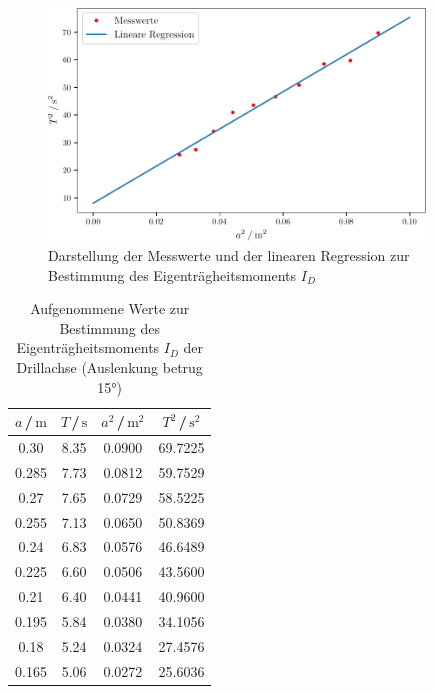 \begin{figure}
    \centering
    \includegraphics[width=10cm]{build/plot.pdf}
    \caption{Darstellung der Messwerte und der linearen Regression zur Bestimmung des Eigenträgheitsmoments $I_D$}
\end{figure}

\begin{table}[H]
\normalsize

\centering
{}
\begin{tabular}{c c c c}
\toprule
    $a$\,/\,$\si{\meter}$ &  $T$\,/\,$\si{\second}$ & $a^2$\,/\,$\si{\meter}^2$ &  $T^2$\,/\,$\si{\second}^2$ \\
    \midrule

0.30  &   8.35 &  0.0900      & 69.7225\\
0.285 &   7.73 &  0.0812  & 59.7529\\
0.27  &   7.65 &  0.0729    & 58.5225\\
0.255 &   7.13 &  0.0650  & 50.8369\\
0.24  &   6.83 &  0.0576    & 46.6489\\
0.225 &   6.60 &  0.0506  & 43.5600\\
0.21  &   6.40 &  0.0441    & 40.9600\\
0.195 &   5.84 &  0.0380  & 34.1056\\
0.18  &   5.24 &  0.0324    & 27.4576\\
0.165 &   5.06 &  0.0272  & 25.6036\\ 

    \bottomrule
\end{tabular}
\caption{Aufgenommene Werte zur Bestimmung des Eigenträgheitsmoments $I_{D}$ der Drillachse (Auslenkung betrug 15°)}
\label{tab:a2}
\end{table}







